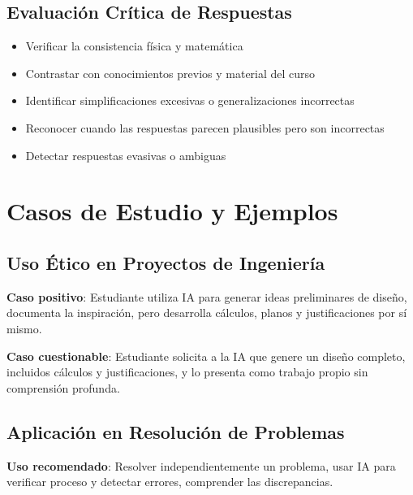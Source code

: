 \documentclass[11pt, letterpaper]{article}
\begin{document}
	\subsection{Evaluación Crítica de Respuestas}
	
	\begin{itemize}
		\item Verificar la consistencia física y matemática
		\item Contrastar con conocimientos previos y material del curso
		\item Identificar simplificaciones excesivas o generalizaciones incorrectas
		\item Reconocer cuando las respuestas parecen plausibles pero son incorrectas
		\item Detectar respuestas evasivas o ambiguas
	\end{itemize}
	
	\section{Casos de Estudio y Ejemplos}
	
	\subsection{Uso Ético en Proyectos de Ingeniería}
	
	\begin{casocaja}
		\textbf{Caso positivo}: Estudiante utiliza IA para generar ideas preliminares de diseño, documenta la inspiración, pero desarrolla cálculos, planos y justificaciones por sí mismo.
	\end{casocaja}
	
	\begin{casocaja}
		\textbf{Caso cuestionable}: Estudiante solicita a la IA que genere un diseño completo, incluidos cálculos y justificaciones, y lo presenta como trabajo propio sin comprensión profunda.
	\end{casocaja}
	
	\subsection{Aplicación en Resolución de Problemas}
	
	\begin{casocaja}
		\textbf{Uso recomendado}: Resolver independientemente un problema, usar IA para verificar proceso y detectar errores, comprender las discrepancias.
	\end{casocaja}
	
\end{document}
